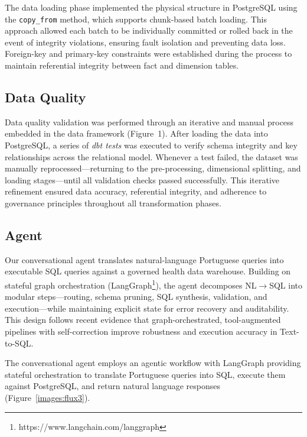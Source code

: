 \documentclass[sigconf,natbib=false]{acmart}
\begin{document}
The data loading phase implemented the physical structure in PostgreSQL using the \texttt{copy\_from} method, which supports chunk-based batch loading.
This approach allowed each batch to be individually committed or rolled back in the event of integrity violations, ensuring fault isolation and preventing data loss.
Foreign-key and primary-key constraints were established during the process to maintain referential integrity between fact and dimension tables.


\subsection{Data Quality}

Data quality validation was performed through an iterative and manual process embedded in the data framework (Figure~1). After loading the data into PostgreSQL, a series of \textit{dbt tests} was executed to verify schema integrity and key relationships across the relational model.
Whenever a test failed, the dataset was manually reprocessed—returning to the pre-processing, dimensional splitting, and loading stages—until all validation checks passed successfully.
This iterative refinement ensured data accuracy, referential integrity, and adherence to governance principles throughout all transformation phases.


\subsection{Agent}
\label{sec:agent}

Our conversational agent translates natural-language Portuguese queries into executable SQL queries against a governed health data warehouse. Building on stateful graph orchestration (LangGraph\footnote{https://www.langchain.com/langgraph}), the agent decomposes NL$\rightarrow$SQL into modular steps—routing, schema pruning, SQL synthesis, validation, and execution—while maintaining explicit state for error recovery and auditability. This design follows recent evidence that graph-orchestrated, tool-augmented pipelines with self-correction improve robustness and execution accuracy in Text-to-SQL.

The conversational agent employs an agentic workflow with LangGraph providing stateful orchestration to translate Portuguese queries into SQL, execute them against PostgreSQL, and return natural language responses (Figure~\ref{images:flux3}).
\end{document}
